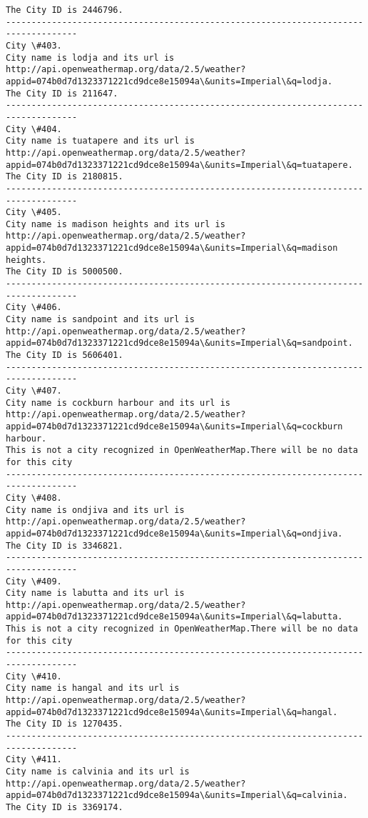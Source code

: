 \documentclass[11pt]{article}
\begin{document}
\begin{Verbatim}[commandchars=\\\{\}]
The City ID is 2446796.
------------------------------------------------------------------------------------
City \#403.
City name is lodja and its url is http://api.openweathermap.org/data/2.5/weather?appid=074b0d7d1323371221cd9dce8e15094a\&units=Imperial\&q=lodja.
The City ID is 211647.
------------------------------------------------------------------------------------
City \#404.
City name is tuatapere and its url is http://api.openweathermap.org/data/2.5/weather?appid=074b0d7d1323371221cd9dce8e15094a\&units=Imperial\&q=tuatapere.
The City ID is 2180815.
------------------------------------------------------------------------------------
City \#405.
City name is madison heights and its url is http://api.openweathermap.org/data/2.5/weather?appid=074b0d7d1323371221cd9dce8e15094a\&units=Imperial\&q=madison heights.
The City ID is 5000500.
------------------------------------------------------------------------------------
City \#406.
City name is sandpoint and its url is http://api.openweathermap.org/data/2.5/weather?appid=074b0d7d1323371221cd9dce8e15094a\&units=Imperial\&q=sandpoint.
The City ID is 5606401.
------------------------------------------------------------------------------------
City \#407.
City name is cockburn harbour and its url is http://api.openweathermap.org/data/2.5/weather?appid=074b0d7d1323371221cd9dce8e15094a\&units=Imperial\&q=cockburn harbour.
This is not a city recognized in OpenWeatherMap.There will be no data for this city
------------------------------------------------------------------------------------
City \#408.
City name is ondjiva and its url is http://api.openweathermap.org/data/2.5/weather?appid=074b0d7d1323371221cd9dce8e15094a\&units=Imperial\&q=ondjiva.
The City ID is 3346821.
------------------------------------------------------------------------------------
City \#409.
City name is labutta and its url is http://api.openweathermap.org/data/2.5/weather?appid=074b0d7d1323371221cd9dce8e15094a\&units=Imperial\&q=labutta.
This is not a city recognized in OpenWeatherMap.There will be no data for this city
------------------------------------------------------------------------------------
City \#410.
City name is hangal and its url is http://api.openweathermap.org/data/2.5/weather?appid=074b0d7d1323371221cd9dce8e15094a\&units=Imperial\&q=hangal.
The City ID is 1270435.
------------------------------------------------------------------------------------
City \#411.
City name is calvinia and its url is http://api.openweathermap.org/data/2.5/weather?appid=074b0d7d1323371221cd9dce8e15094a\&units=Imperial\&q=calvinia.
The City ID is 3369174.

\end{Verbatim}
\end{document}
